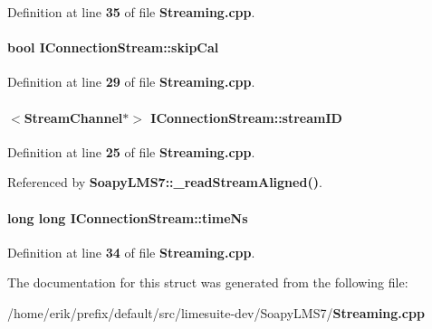 Definition at line {\bf 35} of file {\bf Streaming.\+cpp}.

\paragraph[{skip\+Cal}]{\setlength{\rightskip}{0pt plus 5cm}bool I\+Connection\+Stream\+::skip\+Cal}\label{structIConnectionStream_abc34e4ccf08165c5528e2b2502b5cf34}


Definition at line {\bf 29} of file {\bf Streaming.\+cpp}.

\paragraph[{stream\+ID}]{$<${\bf Stream\+Channel}$\ast$$>$ I\+Connection\+Stream\+::stream\+ID}\label{structIConnectionStream_a2115942414fe45d0d71512ecf7e11605}


Definition at line {\bf 25} of file {\bf Streaming.\+cpp}.



Referenced by {\bf Soapy\+L\+M\+S7\+::\+\_\+read\+Stream\+Aligned()}.

\paragraph[{time\+Ns}]{\setlength{\rightskip}{0pt plus 5cm}long long I\+Connection\+Stream\+::time\+Ns}\label{structIConnectionStream_a70f84691fe75449f0015d9fad535fa93}


Definition at line {\bf 34} of file {\bf Streaming.\+cpp}.



The documentation for this struct was generated from the following file\+:\begin{DoxyCompactItemize}
\item 
/home/erik/prefix/default/src/limesuite-\/dev/\+Soapy\+L\+M\+S7/{\bf Streaming.\+cpp}\end{DoxyCompactItemize}
